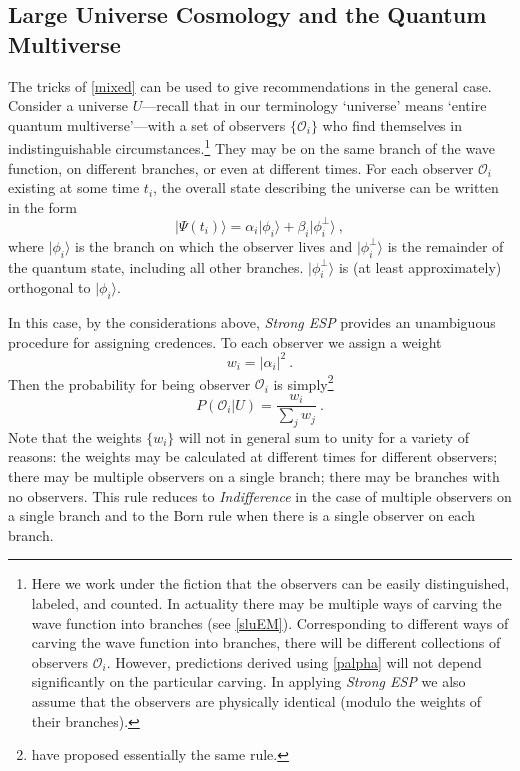 \documentclass[onecolumn,secnumarabic,amsmath,amssymb,balancelastpage,nofootinbib]{article}
\newcommand{\calo}{{\mathcal O}}
\begin{document}
\subsection{Large Universe Cosmology and the Quantum Multiverse}\label{generalmethod}

The tricks of \textsection \ref{mixed} can be used to give recommendations in the general case.  Consider a universe $U$---recall that in our terminology `universe' means `entire quantum multiverse'---with a set of observers $\{\calo_i\}$ who find themselves in indistinguishable circumstances.\footnote{Here we work under the fiction that the observers can be easily distinguished, labeled, and counted.  In actuality there may be multiple ways of carving the wave function into branches {(see \textsection \ref{sluEM})}.  Corresponding to different ways of carving the wave function into branches, there will be different collections of observers $\calo_i$.  However, predictions derived using \eqref{palpha} will not depend significantly on the particular carving.  In applying \emph{Strong ESP} we also assume that the observers are physically identical (modulo the weights of their branches).} They may be on the same branch of the wave function, on different branches, or even at different times. For each observer $\calo_i$ existing at some time $t_i$, the overall state describing the universe can be written in the form
\begin{equation}
  |\Psi(t_i)\rangle = \alpha_{i} |\phi_i\rangle + \beta_i|\phi^\perp_i\rangle\ ,
\end{equation}
where $|\phi_i\rangle$ is the branch on which the observer lives and $|\phi^\perp_i\rangle$ is the remainder of the quantum state, including all other branches.  $|\phi^\perp_i\rangle$ is (at least approximately) orthogonal to $|\phi_i\rangle$.

In this case, by the considerations above, \emph{Strong ESP} provides an unambiguous procedure for assigning credences. To each observer we assign a weight
\begin{equation}
  w_i = |\alpha_i|^2\ .
\end{equation}
Then the probability for being observer $\calo_i$ is simply\footnote{\citet{groisman2013} have proposed essentially the same rule.}
\begin{equation}
  P(\calo_i|U) = \frac{w_i}{\sum_j w_j}\ .
  \label{palpha}
\end{equation}
Note that the weights $\{w_i\}$ will not in general sum to unity for a variety of reasons: the weights may be calculated at different times for different observers; there may be multiple observers on a single branch; there may be branches with no observers. This rule reduces to {\it Indifference} in the case of multiple observers on a single branch and to the Born rule when there is a single observer on each branch.
\end{document}
